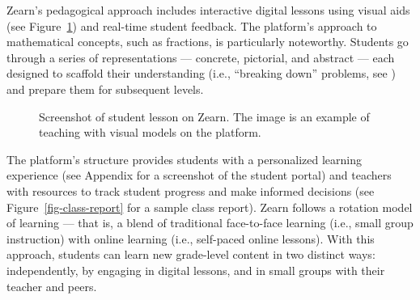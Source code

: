 \documentclass[
  number,
  preprint,
  3p,
  onecolumn]{elsarticle}
\begin{document}
Zearn's pedagogical approach includes interactive digital lessons using
visual aids (see Figure~\ref{fig-zearn-poster}) and real-time student
feedback. The platform's approach to mathematical concepts, such as
fractions, is particularly noteworthy. Students go through a series of
representations --- concrete, pictorial, and abstract --- each designed
to scaffold their understanding (i.e., ``breaking down'' problems, see
\citep{jumaat2014, reiser2014}) and prepare them for subsequent levels.

\begin{figure}


\caption{\label{fig-zearn-poster}Screenshot of student lesson on Zearn.
The image is an example of teaching with visual models on the platform.}

\end{figure}%

The platform's structure provides students with a personalized learning
experience (see Appendix for a screenshot of the student portal) and
teachers with resources to track student progress and make informed
decisions (see Figure~\ref{fig-class-report} for a sample class report).
Zearn follows a rotation model of learning --- that is, a blend of
traditional face-to-face learning (i.e., small group instruction) with
online learning (i.e., self-paced online lessons). With this approach,
students can learn new grade-level content in two distinct ways:
independently, by engaging in digital lessons, and in small groups with
their teacher and peers.
\end{document}
